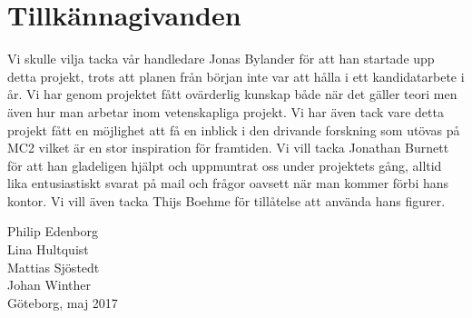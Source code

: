 \documentclass[../../main.tex]{subfiles}
\begin{document}
\thispagestyle{plain}			%
\section*{Tillkännagivanden}

Vi skulle vilja tacka vår handledare Jonas Bylander för att han startade upp detta projekt, trots att planen från början inte var att hålla i ett kandidatarbete i år. Vi har genom projektet fått ovärderlig kunskap både när det gäller teori men även hur man arbetar inom vetenskapliga projekt. Vi har även tack vare detta projekt fått en möjlighet att få en inblick i den drivande forskning som utövas på MC2 vilket är en stor inspiration för framtiden.  Vi vill tacka Jonathan Burnett för att han gladeligen hjälpt och uppmuntrat oss under projektets gång, alltid lika entusiastiskt svarat på mail och frågor oavsett när man kommer förbi hans kontor. Vi vill även tacka Thijs Boehme för tillåtelse att använda hans figurer.



\vspace{1.5cm}
\hfill
\begin{center}
Philip Edenborg\\Lina Hultquist\\Mattias Sjöstedt\\Johan Winther\\ Göteborg, maj 2017
\end{center}

\newpage\null\thispagestyle{empty}\newpage
\end{document}
